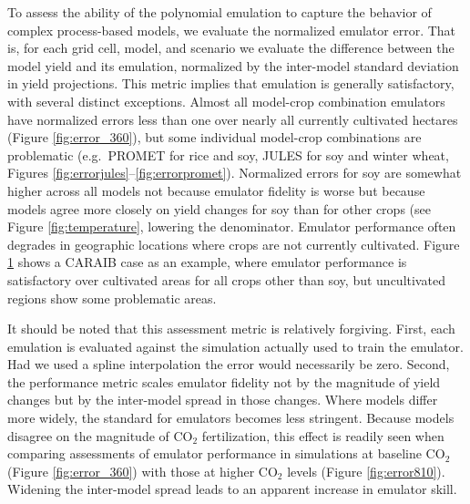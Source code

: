 \documentclass[preprint, 5p, times, twocolumn]{elsarticle}
\begin{document}
\begin{figure}[!p]
   \label{fig:error}
\end{figure}

To assess the ability of the polynomial emulation to capture the behavior of complex process-based models, we evaluate the normalized emulator error. That is, for each grid cell, model, and scenario we evaluate the difference between the model yield and its emulation, normalized by the inter-model standard deviation in yield projections. This metric implies that emulation is generally satisfactory, with several distinct exceptions. Almost all model-crop combination emulators have normalized errors less than one over nearly all currently cultivated hectares (Figure \ref{fig:error_360}), but some individual model-crop combinations are problematic (e.g.\ PROMET for rice and soy, JULES for soy and winter wheat, Figures \ref{fig:errorjules}--\ref{fig:errorpromet}). Normalized errors for soy are somewhat higher across all models not because emulator fidelity is worse but because models agree more closely on yield changes for soy than for other crops (see Figure \ref{fig:temperature}, lowering the denominator. Emulator performance often degrades in geographic locations where crops are not currently cultivated. Figure \ref{fig:error} shows a CARAIB case as an example, where emulator performance is satisfactory over cultivated areas for all crops other than soy, but uncultivated regions show some problematic areas. 

It should be noted that this assessment metric is relatively forgiving. First, each emulation is evaluated against the simulation actually used to train the emulator. Had we used a spline interpolation the error would necessarily be zero. Second, the performance metric scales emulator fidelity not by the magnitude of yield changes but by the inter-model spread in those changes. Where models differ more widely, the standard for emulators becomes less stringent. Because models disagree on the magnitude of CO$_2$ fertilization, this effect is readily seen when comparing assessments of emulator performance in simulations at  baseline CO$_2$ (Figure \ref{fig:error_360}) with those at higher CO$_2$ levels (Figure \ref{fig:error810}). Widening the inter-model spread leads to an apparent increase in emulator skill.
\end{document}
